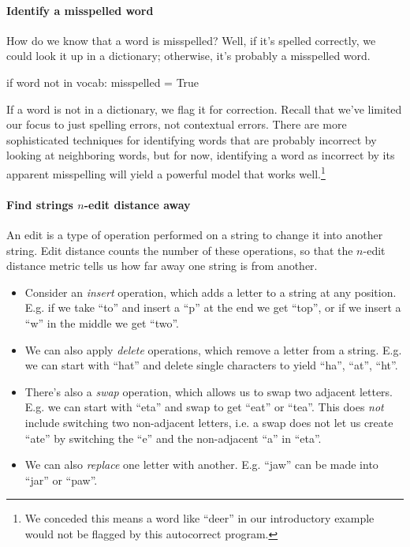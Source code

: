 \documentclass[12pt]{article}
\begin{document}
\paragraph{Identify a misspelled word} How do we know that a word is misspelled? Well, if it's spelled correctly, we could look it up in a dictionary; otherwise, it's probably a misspelled word.
\begin{python}
if word not in vocab:
  misspelled = True
\end{python}
If a word is not in a dictionary, we flag it for correction. Recall that we've limited our focus to just spelling errors, not contextual errors. There are more sophisticated techniques for identifying words that are probably incorrect by looking at neighboring words, but for now, identifying a word as incorrect by its apparent misspelling will yield a powerful model that works well.\footnote{We conceded this means a word like ``deer'' in our introductory   example would not be flagged by this autocorrect program.}

\paragraph{Find strings $n$-edit distance away} An edit is a type of operation performed on a string to change it into another string. Edit distance counts the number of these operations, so that the $n$-edit distance metric tells us how far away one string is from another.
\begin{itemize}
  \item Consider an \emph{insert} operation, which adds a letter to a string at any position. E.g. if we take ``to'' and insert a ``p'' at the end we get ``top'', or if we insert a ``w'' in the middle we get ``two''.
\item We can also apply \emph{delete} operations, which remove a letter from a string. E.g. we can start with ``hat'' and delete single characters to yield ``ha'', ``at'', ``ht''.
\item There's also a \emph{swap} operation, which allows us to swap two adjacent letters. E.g. we can start with ``eta'' and swap to get ``eat'' or ``tea''. This does \emph{not} include switching two non-adjacent letters, i.e. a swap does not let us create ``ate'' by switching the ``e'' and the non-adjacent ``a'' in ``eta''.
\item We can also \emph{replace} one letter with another. E.g. ``jaw'' can be made into ``jar'' or ``paw''.
\end{itemize}
\end{document}
